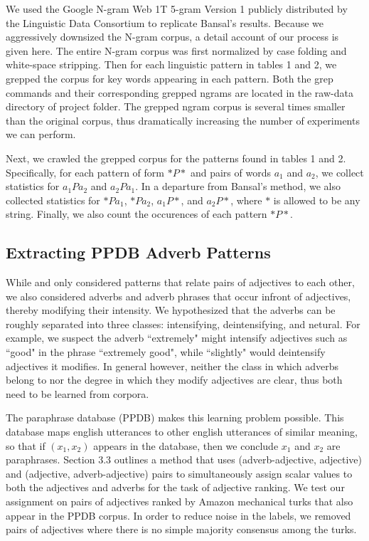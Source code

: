 We used the Google N-gram Web 1T 5-gram Version 1 publicly distributed by the Linguistic Data Consortium to replicate Bansal's results. Because we aggressively downsized the N-gram corpus, a detail account of our process is given here. The entire N-gram corpus was first normalized by case folding and white-space stripping. Then for each linguistic pattern in tables 1 and 2, we grepped the corpus for key words appearing in each pattern. Both the grep commands and their corresponding grepped ngrams are located in the raw-data directory of project folder. The grepped ngram corpus is several times smaller than the original corpus, thus dramatically increasing the number of experiments we can perform.

Next, we crawled the grepped corpus for the patterns found in tables 1 and 2. Specifically, for each pattern of form $* P *$ and pairs of words $a_1$ and $a_2$, we collect statistics for $a_1 P a_2$ and $a_2 P a_1$. In a departure from Bansal's method, we also collected statistics for $* P a_1$, $* P a_2$, $a_1 P *$, and $a_2 P *$, where $*$ is allowed to be any string. Finally, we also count the occurences of each pattern $* P *$.

\subsection{Extracting PPDB Adverb Patterns}

While  and  only considered patterns that relate pairs of adjectives to each other, we also considered adverbs and adverb phrases that occur infront of adjectives, thereby modifying their intensity. We hypothesized that the adverbs can be roughly separated into three classes: intensifying, deintensifying, and netural. For example, we suspect the adverb ``extremely" might intensify adjectives such as ``good" in the phrase ``extremely good", while ``slightly" would deintensify adjectives it modifies. In general however, neither the class in which adverbs belong to nor the degree in which they modify adjectives are clear, thus both need to be learned from corpora. 

The paraphrase database (PPDB) \cite{pavlick-EtAl:2015:ACL-IJCNLP3} makes this learning problem possible. This database maps english utterances to other english utterances of similar meaning, so that if $(x_1, x_2)$ appears in the database, then we conclude $x_1$ and $x_2$ are paraphrases. Section 3.3 outlines a method that uses (adverb-adjective, adjective) and (adjective, adverb-adjective) pairs to simultaneously assign scalar values to both the adjectives and adverbs for the task of adjective ranking. We test our assignment on pairs of adjectives ranked by Amazon mechanical turks that also appear in the PPDB corpus. In order to reduce noise in the labels, we removed pairs of adjectives where there is no simple majority consensus among the turks. 

